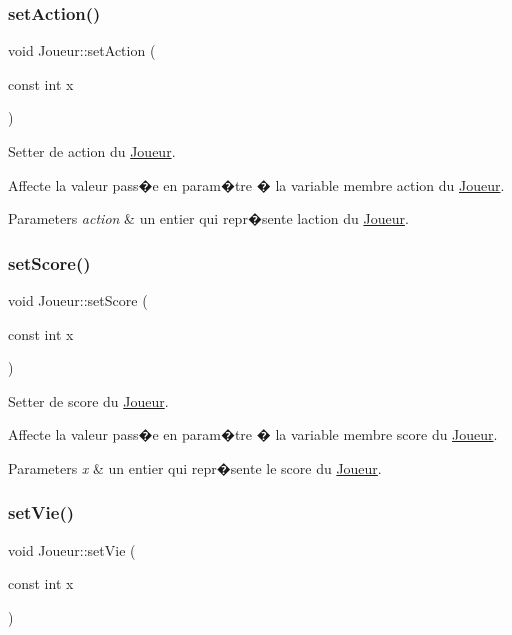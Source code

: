 \subsubsection{\texorpdfstring{set\+Action()}{setAction()}}
{\footnotesize\ttfamily void Joueur\+::set\+Action (\begin{DoxyParamCaption}\item[{const int}]{x }\end{DoxyParamCaption})}



Setter de action du \hyperlink{classJoueur}{Joueur}. 

Affecte la valeur pass�e en param�tre � la variable membre action du \hyperlink{classJoueur}{Joueur}. 
\begin{DoxyParams}{Parameters}
{\em action} & un entier qui repr�sente l\textquotesingle{}action du \hyperlink{classJoueur}{Joueur}. \\
\hline
\end{DoxyParams}
\mbox{\label{classJoueur_a7da45ee15b13b73f2dc90b05714b0f41}} 
\subsubsection{\texorpdfstring{set\+Score()}{setScore()}}
{\footnotesize\ttfamily void Joueur\+::set\+Score (\begin{DoxyParamCaption}\item[{const int}]{x }\end{DoxyParamCaption})}



Setter de score du \hyperlink{classJoueur}{Joueur}. 

Affecte la valeur pass�e en param�tre � la variable membre score du \hyperlink{classJoueur}{Joueur}. 
\begin{DoxyParams}{Parameters}
{\em x} & un entier qui repr�sente le score du \hyperlink{classJoueur}{Joueur}. \\
\hline
\end{DoxyParams}
\mbox{\label{classJoueur_ab417539a787e7157bf8cbbfaa1d309c7}} 
\subsubsection{\texorpdfstring{set\+Vie()}{setVie()}}
{\footnotesize\ttfamily void Joueur\+::set\+Vie (\begin{DoxyParamCaption}\item[{const int}]{x }\end{DoxyParamCaption})}



